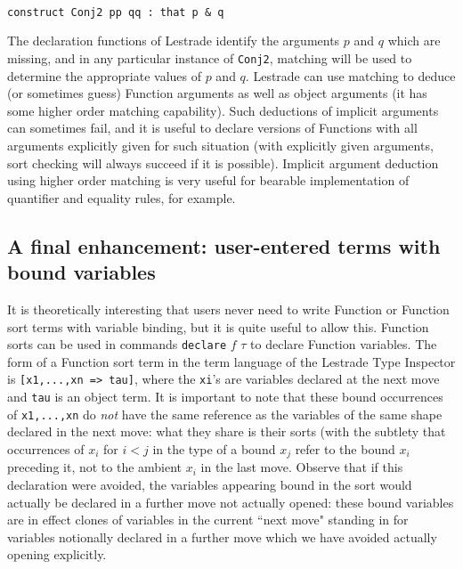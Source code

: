 \documentclass{article}
\begin{document}
\begin{verbatim}

construct Conj2 pp qq : that p & q

\end{verbatim}

The declaration functions of Lestrade identify the arguments $p$ and $q$ which are missing, and in any particular instance of {\tt Conj2}, matching will be used to determine the appropriate values of $p$ and $q$.  Lestrade can use matching to deduce (or sometimes guess) Function arguments as well as object arguments (it has some higher order matching capability).  Such deductions of implicit arguments can sometimes fail, and it is useful to declare versions of
Functions with all arguments explicitly given for such situation (with explicitly given arguments, sort checking will always succeed if it is possible).  Implicit argument deduction using higher order matching is very useful for bearable implementation of quantifier and equality rules, for example.

\subsection{A final enhancement:  user-entered terms with bound variables}

It is theoretically interesting that users never need to write Function or Function sort terms with variable binding, but it is quite useful to allow this.  Function sorts can be used in commands {\tt declare} $f$ $\tau$ to declare Function variables.  The form of a Function sort term in the term language of the Lestrade Type Inspector is {\tt [x1,...,xn => tau]}, where the {\tt xi}'s are variables declared at the next move and {\tt tau} is an object term.  It is important to note that these bound occurrences of {\tt x1,...,xn} do {\em not\/} have the same reference as the variables of the same shape declared in the next move:  what they share is their sorts (with the subtlety that occurrences of $x_i$ for $i<j$ in the type of a bound $x_j$ refer to the bound $x_i$ preceding it, not to the ambient $x_i$ in the last move.  Observe that if this declaration were avoided, the variables appearing bound in the sort would actually be declared in a further move not actually opened:  these bound variables are in effect clones of variables in the current ``next move" standing in for variables notionally declared in a further move which we have avoided actually opening explicitly.
\end{document}
